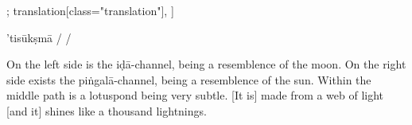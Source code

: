 \documentclass[12pt]{article}%
\def\om{\textrm{\foreignlanguage{english}{\footnotesize omitted in\ }}} %
\begin{document}
\begin{alignment}[
    texts=edition[class="edition"];
    translation[class="translation"],
  ]
\begin{edition}
\begin{prose}
        'tisūkṣmā
        /
        /
      \end{prose}
    \end{edition}
    \begin{translation}
      \begin{tlate}On the left side is the iḍā-channel, being a resemblence of the moon. On the right side exists the piṅgalā-channel, being a resemblence of the sun. Within the middle path is a lotuspond being very subtle. [It is] made from a web of light [and it] shines like a thousand lightnings. \end{tlate}
    \end{translation}
    \begin{edition}
      \begin{prose}

\end{prose}
\end{edition}
\end{alignment}
\end{document}
